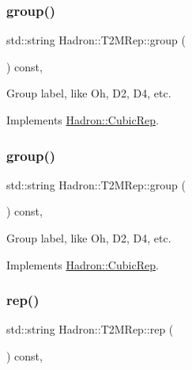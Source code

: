 \subsubsection{\texorpdfstring{group()}{group()}\hspace{0.1cm}{\footnotesize\ttfamily [1/2]}}
{\footnotesize\ttfamily std\+::string Hadron\+::\+T2\+M\+Rep\+::group (\begin{DoxyParamCaption}{ }\end{DoxyParamCaption}) const\hspace{0.3cm}{\ttfamily [inline]}, {\ttfamily [virtual]}}

Group label, like Oh, D2, D4, etc. 

Implements \mbox{\hyperlink{structHadron_1_1CubicRep_a0748f11ec87f387062c8e8981339a29c}{Hadron\+::\+Cubic\+Rep}}.

\mbox{\label{structHadron_1_1T2MRep_a1326313751ae23194da5dcb326ac44a1}} 
\subsubsection{\texorpdfstring{group()}{group()}\hspace{0.1cm}{\footnotesize\ttfamily [2/2]}}
{\footnotesize\ttfamily std\+::string Hadron\+::\+T2\+M\+Rep\+::group (\begin{DoxyParamCaption}{ }\end{DoxyParamCaption}) const\hspace{0.3cm}{\ttfamily [inline]}, {\ttfamily [virtual]}}

Group label, like Oh, D2, D4, etc. 

Implements \mbox{\hyperlink{structHadron_1_1CubicRep_a0748f11ec87f387062c8e8981339a29c}{Hadron\+::\+Cubic\+Rep}}.

\mbox{\label{structHadron_1_1T2MRep_aa55b94a93f3336ef06369b8e2d544160}} 
\subsubsection{\texorpdfstring{rep()}{rep()}\hspace{0.1cm}{\footnotesize\ttfamily [1/2]}}
{\footnotesize\ttfamily std\+::string Hadron\+::\+T2\+M\+Rep\+::rep (\begin{DoxyParamCaption}{ }\end{DoxyParamCaption}) const\hspace{0.3cm}{\ttfamily [inline]}, {\ttfamily [virtual]}}

